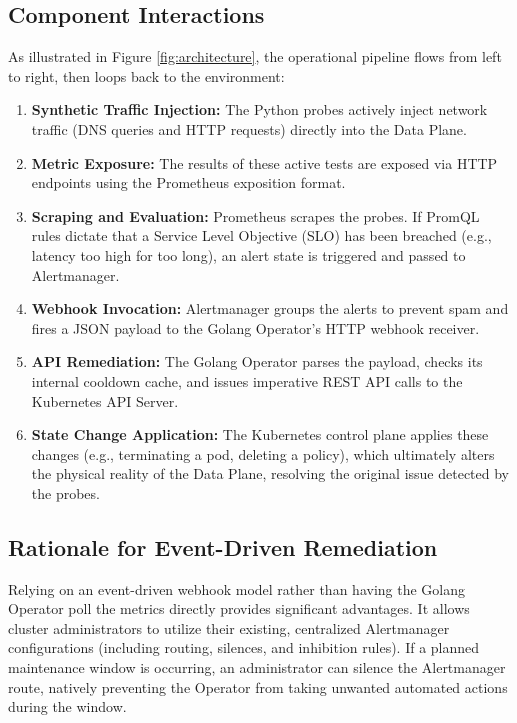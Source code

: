 \documentclass[12pt,a4paper]{article}
\begin{document}
\subsection{Component Interactions}
As illustrated in Figure \ref{fig:architecture}, the operational pipeline flows from left to right, then loops back to the environment:
\begin{enumerate}
    \item \textbf{Synthetic Traffic Injection:} The Python probes actively inject network traffic (DNS queries and HTTP requests) directly into the Data Plane.
    \item \textbf{Metric Exposure:} The results of these active tests are exposed via HTTP endpoints using the Prometheus exposition format.
    \item \textbf{Scraping and Evaluation:} Prometheus scrapes the probes. If PromQL rules dictate that a Service Level Objective (SLO) has been breached (e.g., latency too high for too long), an alert state is triggered and passed to Alertmanager.
    \item \textbf{Webhook Invocation:} Alertmanager groups the alerts to prevent spam and fires a JSON payload to the Golang Operator's HTTP webhook receiver.
    \item \textbf{API Remediation:} The Golang Operator parses the payload, checks its internal cooldown cache, and issues imperative REST API calls to the Kubernetes API Server.
    \item \textbf{State Change Application:} The Kubernetes control plane applies these changes (e.g., terminating a pod, deleting a policy), which ultimately alters the physical reality of the Data Plane, resolving the original issue detected by the probes.
\end{enumerate}

\subsection{Rationale for Event-Driven Remediation}
Relying on an event-driven webhook model rather than having the Golang Operator poll the metrics directly provides significant advantages. It allows cluster administrators to utilize their existing, centralized Alertmanager configurations (including routing, silences, and inhibition rules). If a planned maintenance window is occurring, an administrator can silence the Alertmanager route, natively preventing the Operator from taking unwanted automated actions during the window.
\end{document}
